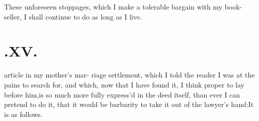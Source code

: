 \documentclass{article}
\begin{document}
These unforeseen stoppages, which I
make a tolerable bargain with my book- seller, I shall continue
to do as long as I live.


\null
\section{.\enspace XV.}

 article in my mother’s mar-\break 
riage settlement, which I told the\break
reader I was at the pains to search for, and which, now that I have
found it, I think proper to lay before him,\tsk is so much more fully
express’d in the deed itself, than ever I can pretend to do it, that it
would be barbarity to take it out of the lawyer’s hand:\tsk It is as
follows.
\end{document}
